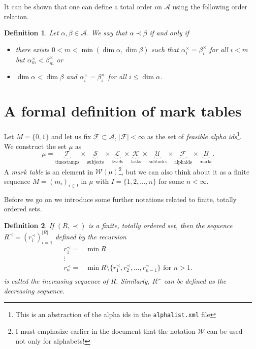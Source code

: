 \documentclass{scrartcl}
\newtheorem{mydef}{Definition}
\begin{document}
It can be shown that one can define a total order on $\mathcal{A}$ using the following order relation.

\begin{mydef}
Let $\alpha, \beta\in\mathcal{A}$. We say that $\alpha\prec\beta$ if and only if
\begin{itemize}
\item there exists $0<m<\min(\dim\alpha,\dim\beta)$ such that $\alpha^{\times}_i=\beta^{\times}_i$ for all $i<m$ but $\alpha^{\times}_m<\beta^{\times}_m$ or
\item $\dim\alpha < \dim\beta$ and $\alpha^{\times}_i=\beta^{\times}_i$ for all $i\leq\dim\alpha$.
\end{itemize}
\end{mydef}

\section{A formal definition of mark tables}
Let $M=\{0,1\}$ and let us fix $\mathcal{F}\subset\mathcal{A}$, $|\mathcal{F}|<\infty$ as the set of \emph{feasible alpha ids}\footnote{This is an abstraction of the alpha ids in the \texttt{alphalist.xml} file}. We construct the set $\mu$ as 
$$\mu=\underbrace{\mathcal{T}}_{\mbox{timestamps}}\times\underbrace{\mathcal{S}}_{\mbox{subjects}}\times\underbrace{\mathcal{L}}_{\mbox{levels}}\times\underbrace{\mathcal{K}}_{\mbox{tasks}}\times\underbrace{\mathcal{U}}_{\mbox{subtasks}}\times\underbrace{\mathcal{F}}_{\mbox{alphaids}}\times \underbrace{B}_{\mbox{marks}}.$$ 
A \emph{mark table} is an element in $\mathcal{W}(\mathcal{\mu})$\footnote{I must emphasize earlier in the document that the notation $\mathcal{W}$ can be used not only for alphabets!}, but we can also think about it as a finite sequence $M=(m_i)_{i\in I}$ in $\mu$ with $I=\{1,2,\ldots,n\}$ for some $n<\infty$.

Before we go on we introduce some further notations related to finite, totally ordered sets.
\begin{mydef}
If $(R,\prec)$ is a finite, totally ordered set, then the sequence $R^{\prec}=(r^{\prec}_i)_{i=1}^{|R|}$ defined by the recursion
\begin{equation}
\begin{split}
r^{\prec}_1= & \min R\\
\vdots &\\
r^{\prec}_n = & \min R\setminus\{r^{\prec}_1,r^{\prec}_2,\ldots,r^{\prec}_{n-1}\} \mbox{ for } n>1.\\
\end{split}
\end{equation}
is called the \emph{increasing sequence} of $R$. Similarly, $R^{\succ}$ can be defined as the \emph{decreasing sequence}.
\end{mydef}
\end{document}

